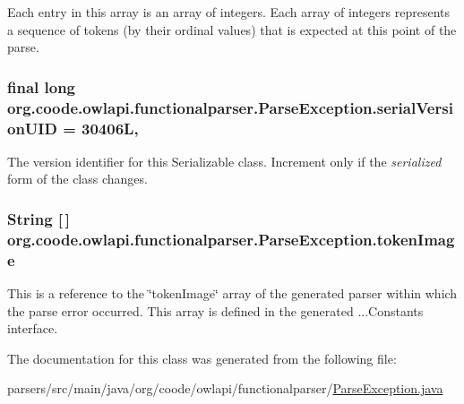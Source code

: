 Each entry in this array is an array of integers. Each array of integers represents a sequence of tokens (by their ordinal values) that is expected at this point of the parse. \hypertarget{classorg_1_1coode_1_1owlapi_1_1functionalparser_1_1_parse_exception_af7b6c7b408cf114adb62fbc83df21bab}{
\subsubsection[{serial\-Version\-U\-I\-D}]{\setlength{\rightskip}{0pt plus 5cm}final long org.\-coode.\-owlapi.\-functionalparser.\-Parse\-Exception.\-serial\-Version\-U\-I\-D = 30406\-L\hspace{0.3cm}{\ttfamily [static]}, {\ttfamily [private]}}}\label{classorg_1_1coode_1_1owlapi_1_1functionalparser_1_1_parse_exception_af7b6c7b408cf114adb62fbc83df21bab}
The version identifier for this Serializable class. Increment only if the {\itshape serialized} form of the class changes. \hypertarget{classorg_1_1coode_1_1owlapi_1_1functionalparser_1_1_parse_exception_ae954fccb0efb481cee03b85bdab0faec}{
\subsubsection[{token\-Image}]{\setlength{\rightskip}{0pt plus 5cm}String \mbox{[}$\,$\mbox{]} org.\-coode.\-owlapi.\-functionalparser.\-Parse\-Exception.\-token\-Image}}\label{classorg_1_1coode_1_1owlapi_1_1functionalparser_1_1_parse_exception_ae954fccb0efb481cee03b85bdab0faec}
This is a reference to the \char`\"{}token\-Image\char`\"{} array of the generated parser within which the parse error occurred. This array is defined in the generated ...Constants interface. 

The documentation for this class was generated from the following file\-:\begin{DoxyCompactItemize}
\item 
parsers/src/main/java/org/coode/owlapi/functionalparser/\hyperlink{org_2coode_2owlapi_2functionalparser_2_parse_exception_8java}{Parse\-Exception.\-java}\end{DoxyCompactItemize}

